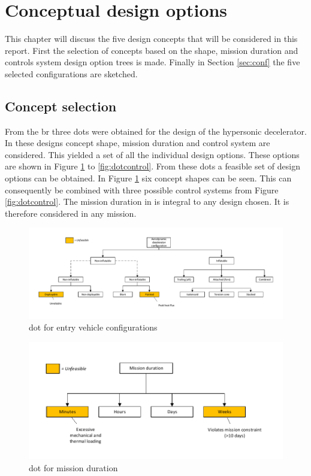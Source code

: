 \section{Conceptual design options} \label{ch:options}
This chapter will discuss the five design concepts that will be considered in this report. First the selection of concepts based on the shape, mission duration and controls system design option trees is made. Finally in Section \ref{sec:conf} the five selected configurations are sketched. 

\subsection{Concept selection}
 From the \acrfull{br} three \glspl{dot} were obtained for the design of the hypersonic decelerator. In these designs concept shape, mission duration and control system are considered. This yielded a set of all the individual design options. These options are shown in Figure \ref{fig:dotshape} to \ref{fig:dotcontrol}. From these \glspl{dot} a feasible set of design options can be obtained. In Figure \ref{fig:dotshape} six concept shapes can be seen. This can consequently be combined with three possible control systems from Figure \ref{fig:dotcontrol}. The mission duration in is integral to any design chosen. It is therefore considered in any mission. 

\begin{figure}[H]
\hspace{-23mm}
\includegraphics[width = 1.25\textwidth]{Figure/DOT_configuration.pdf}
\vspace{-5mm}
\caption{\acrlong{dot} for entry vehicle configurations}
\label{fig:dotshape}
\end{figure}

\begin{figure}[H]
\centering
\includegraphics[width = 1.0\textwidth]{Figure/DOT_missionduration.pdf}
\vspace{-5mm}
\caption{\acrlong{dot} for mission duration}
\label{fig:dotduration}
\end{figure}

